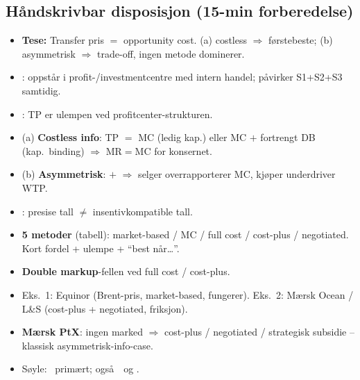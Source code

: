 \subsection*{Håndskrivbar disposisjon (15-min forberedelse)}
\begin{itemize}\setlength{\itemsep}{2pt}
\item \textbf{Tese:} Transfer pris $=$ opportunity cost. (a) costless $\Rightarrow$ f\o rstebeste; (b) asymmetrisk $\Rightarrow$ trade-off, ingen metode dominerer.
\item {}: oppst\aa r i profit-/investmentcentre med intern handel; p\aa virker S1+S2+S3 samtidig.
\item {}: TP er ulempen ved profitcenter-strukturen.
\item (a) \textbf{Costless info}: TP $=$ MC (ledig kap.) eller MC $+$ fortrengt DB (kap.\ binding) $\Rightarrow$ MR$=$MC for konsernet.
\item (b) \textbf{Asymmetrisk}:  $+$  $\Rightarrow$ selger overrapporterer MC, kj\o per underdriver WTP.
\item {}: presise tall $\neq$ insentivkompatible tall.
\item \textbf{5 metoder} (tabell): market-based / MC / full cost / cost-plus / negotiated. Kort fordel + ulempe + ``best n\aa r\dots''.
\item \textbf{Double markup}-fellen ved full cost / cost-plus.
\item Eks.\ 1: Equinor (Brent-pris, market-based, fungerer). Eks.\ 2: M\ae rsk Ocean / L\&S (cost-plus + negotiated, friksjon).
\item \textbf{M\ae rsk PtX}: ingen marked $\Rightarrow$ cost-plus / negotiated / strategisk subsidie -- klassisk asymmetrisk-info-case.
\item S\o yle: \STwo\ prim\ae rt; ogs\aa\ \SOne\ og \SThree.
\end{itemize}
